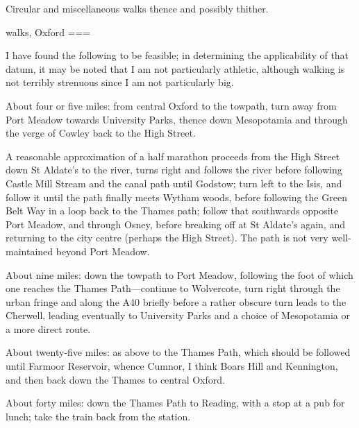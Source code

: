 Circular and miscellaneous walks thence and possibly thither.

walks, Oxford
===

I have found the following to be feasible; in determining the applicability of that datum, it may be noted that I am not particularly athletic, although walking is not terribly strenuous since I am not particularly big.

About four or five miles: from central Oxford to the towpath, turn away from Port Meadow towards University Parks, thence down Mesopotamia and through the verge of Cowley back to the High Street.

A reasonable approximation of a half marathon proceeds from the High Street down St Aldate’s to the river, turns right and follows the river before following Castle Mill Stream and the canal path until Godstow; turn left to the Isis, and follow it until the path finally meets Wytham woods, before following the Green Belt Way in a loop back to the Thames path; follow that southwards opposite Port Meadow, and through Osney, before breaking off at St Aldate’s again, and returning to the city centre (perhaps the High Street). The path is not very well-maintained beyond Port Meadow.

About nine miles: down the towpath to Port Meadow, following the foot of which one reaches the Thames Path—continue to Wolvercote, turn right through the urban fringe and along the A40 briefly before a rather obscure turn leads to the Cherwell, leading eventually to University Parks and a choice of Mesopotamia or a more direct route.

About twenty-five miles: as above to the Thames Path, which should be followed until Farmoor Reservoir, whence Cumnor, I think Boars Hill and Kennington, and then back down the Thames to central Oxford.

About forty miles: down the Thames Path to Reading, with a stop at a pub for lunch; take the train back from the station.